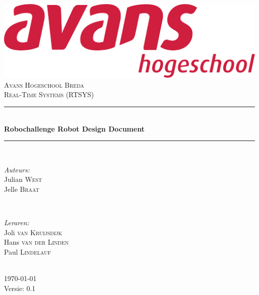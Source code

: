 \documentclass[12pt]{article} %
\begin{document}
\begin{titlepage}
\newcommand{\HRule}{\rule{\linewidth}{0.5mm}} %

\center %
\includegraphics[scale=.1,keepaspectratio]{avans.pdf} \\
\textsc{\Large Avans Hogeschool Breda}\\[0.5cm] %
\textsc{\large Real-Time Systems (RTSYS)}\\[0.5cm] %
\HRule \\[0.4cm]
{ \huge \bfseries Robochallenge Robot Design Document}\\[0.4cm] %
\HRule \\[1.5cm]

\begin{minipage}{0.4\textwidth}
\begin{flushleft} \large
\emph{Auteurs:}\\
Julian \textsc{West} \\
Jelle \textsc{Braat} \\
\end{flushleft}
\end{minipage}
~
\begin{minipage}{0.4\textwidth}
\begin{flushright} \large
\emph{Leraren:} \\
Joli \textsc{van Kruijsdijk} \\ %
Hans \textsc{van der Linden} \\
Paul \textsc{Lindelauf} %
\end{flushright}
\end{minipage}\\[4cm]

{\large \today}\\[3cm] %
Versie: 0.1
\vfill %

\end{titlepage}
\end{document}
